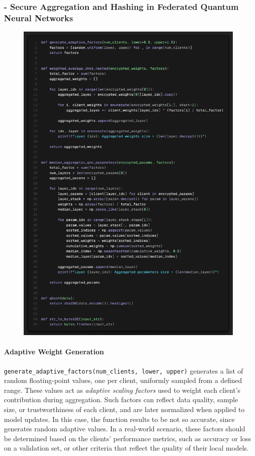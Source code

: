 \documentclass[10pt]{article}
\begin{document}
\subsubsection*{- Secure Aggregation and Hashing in Federated Quantum Neural Networks}
\begin{figure}[H]
	\centering
	\includegraphics[height = 0.6\textheight]{img/QFL_code/2.png}
\end{figure}
\paragraph{Adaptive Weight Generation}
\texttt{generate\_adaptive\_factors(num\_clients, lower, upper)} generates a list of random floating-point values, one per client, uniformly sampled from a defined range. These values act as \textit{adaptive scaling factors} used to weight each client's contribution during aggregation. Such factors can reflect data quality, sample size, or trustworthiness of each client, and are later normalized when applied to model updates. In this case, the function results to be not so accurate, since generates random adaptive values. In a real-world scenario, these factors should be determined based on the clients' performance metrics, such as accuracy or loss on a validation set, or other criteria that reflect the quality of their local models.
\end{document}
